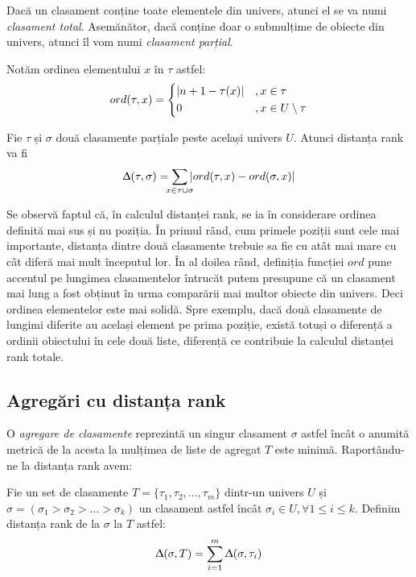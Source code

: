 Dacă un clasament conține toate elementele din univers, atunci el se va numi 
\textit{clasament total}. Asemănător, dacă conține doar o submulțime de obiecte din univers, atunci
îl vom numi \textit{clasament parțial}.

Notăm ordinea elementului $x$ în $\tau$ astfel:
\begin{gather}
\label{ord}
  ord(\tau, x)= \begin{dcases}
    |n + 1 - \tau(x)|    &, x \in \tau \\
    0                    &, x \in U \setminus \tau
  \end{dcases}
\end{gather}

\begin{definition}
Fie $\tau$ și $\sigma$ două clasamente parțiale peste același univers $U$. Atunci distanța rank va fi
\begin{gather}
  \Updelta(\tau, \sigma) = \smashoperator{\sum_{x \in \tau \cup \sigma}} |ord(\tau, x) - ord(\sigma, x)|
\end{gather}
\end{definition}

Se observă faptul că, în calculul distanței rank, se ia în considerare ordinea definită mai sus
și nu poziția. În primul rând, cum primele poziții sunt cele mai importante, distanța dintre două
clasamente trebuie sa fie cu atât mai mare cu cât diferă mai mult începutul lor.\cite{linguisticstructuresmarcus}
În al doilea rând, definiția funcției $ord$ pune accentul pe lungimea clasamentelor întrucăt putem
presupune că un clasament mai lung a fost obținut în urma comparării mai multor obiecte din univers.
Deci ordinea elementelor este mai solidă. Spre exemplu, dacă două clasamente de lungimi diferite au
același element pe prima poziție, există totuși o diferență a ordinii obiectului în cele două liste,
diferență ce contribuie la calculul distanței rank totale.\cite{rankaggregationproblem}

\subsection{Agregări cu distanța rank}
O \textit{agregare de clasamente} reprezintă un singur clasament $\sigma$ astfel încât o anumită 
metrică de la acesta la mulțimea de liste de agregat $T$ este minimă. Raportându-ne la distanța
rank avem\cite{rankdistance}:

\begin{definition}
Fie un set de clasamente $T = \{\tau_1, \tau_2, ..., \tau_m\}$ dintr-un univers $U$ și
$\sigma = (\sigma_1 > \sigma_2 > ... > \sigma_k)$ un clasament astfel încât $\sigma_i \in U, 
\forall 1 \leqslant i \leqslant k$. Definim distanța rank de la $\sigma$ la $T$ astfel:
\begin{gather}
  \Updelta(\sigma, T) = \smashoperator{\sum_{i = 1}^{m}} \Updelta(\sigma, \tau_i)
\end{gather}
\end{definition}

